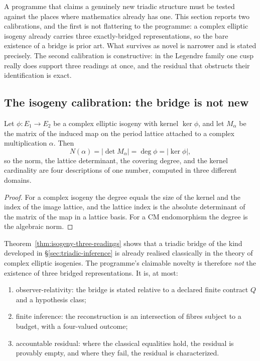 \label{sec:classical-body}

A programme that claims a genuinely new triadic structure must be tested against the
places where mathematics already has one.  This section reports two calibrations, and
the first is not flattering to the programme: a complex elliptic isogeny already
carries three exactly-bridged representations, so the bare existence of a bridge is
prior art.  What survives as novel is narrower and is stated precisely.  The second
calibration is constructive: in the Legendre family one cusp really does support three
readings at once, and the residual that obstructs their identification is exact.

\subsection{The isogeny calibration: the bridge is not new}

\begin{theorem}\label{thm:isogeny-three-readings}
Let $\phi\colon E_1\to E_2$ be a complex elliptic isogeny with kernel $\ker\phi$, and let
$M_\alpha$ be the matrix of the induced map on the period lattice attached to a complex
multiplication $\alpha$.  Then
\[
  N(\alpha)=|\det M_\alpha|=\deg\phi=|\ker\phi| ,
\]
so the norm, the lattice determinant, the covering degree, and the kernel cardinality
are four descriptions of one number, computed in three different domains.
\end{theorem}

\begin{proof}
For a complex isogeny the degree equals the size of the kernel and the index of the
image lattice, and the lattice index is the absolute determinant of the matrix of the
map in a lattice basis.  For a CM endomorphism the degree is the algebraic norm.
\end{proof}

\begin{calibration}\label{cal:isogeny-novelty}
Theorem~\ref{thm:isogeny-three-readings} shows that a triadic bridge of the kind
developed in \S\ref{sec:triadic-inference} is already realised classically in the
theory of complex elliptic isogenies.  The programme's claimable novelty is therefore
\emph{not} the existence of three bridged representations.  It is, at most:
\begin{enumerate}
\item observer-relativity: the bridge is stated relative to a declared finite contract
  $Q$ and a hypothesis class;
\item finite inference: the reconstruction is an intersection of fibres subject to a
  budget, with a four-valued outcome;
\item accountable residual: where the classical equalities hold, the residual is
  provably empty, and where they fail, the residual is characterized.
\end{enumerate}
\end{calibration}

